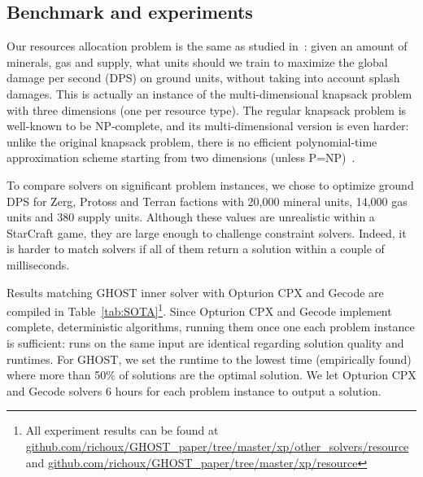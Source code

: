 \documentclass[journal]{IEEEtran}
\newcommand{\ghost}{\textsc{GHOST}\xspace}
\begin{document}
{\subsection{Benchmark and experiments}

Our   resources   allocation   problem   is  the   same   as   studied
in~\cite{aiide15_rts}: given  an amount  of minerals, gas  and supply,
what units  should we train to  maximize the global damage  per second
(DPS) on  ground units,  without taking  into account  splash damages.
This is actually an instance of the multi-dimensional knapsack problem
with three  dimensions (one per  resource type). The  regular knapsack
problem  is well-known  to be  NP-complete, and  its multi-dimensional
version is even harder: unlike the original knapsack problem, there is
no efficient  polynomial-time approximation  scheme starting  from two
dimensions (unless P=NP)~\cite{KulikS10}.

To  compare solvers  on  significant problem  instances,  we chose  to
optimize ground DPS for Zerg,  Protoss and Terran factions with 20,000
mineral units, 14,000  gas units and 380 supply  units. Although these
values are unrealistic within a  StarCraft game, they are large enough
to challenge constraint solvers. Indeed, it is harder to match solvers
if all of them return a solution within a couple of milliseconds.

Results matching \ghost inner solver  with Opturion CPX and Gecode are
compiled  in  Table~\ref{tab:SOTA}\footnote{All  experiment results can     be     found     at
  \href{https://github.com/richoux/GHOST\_paper/tree/master/xp/other\_solvers/resource}{github.com/richoux/GHOST\_paper/tree/master/xp/other\_solvers/resource}
  and \href{https://github.com/richoux/GHOST\_paper/tree/master/xp/resource}{github.com/richoux/GHOST\_paper/tree/master/xp/resource}}.
Since Opturion CPX and Gecode
implement complete,  deterministic algorithms,  running them  once one
each  problem instance  is  sufficient:  runs on  the  same input  are
identical regarding solution quality and  runtimes. For \ghost, we set
the runtime  to the  lowest time (empirically  found) where  more than
50\% of solutions  are the optimal solution.  We let  Opturion CPX and
Gecode solvers 6 hours for each problem instance to output a solution.

}
\end{document}
